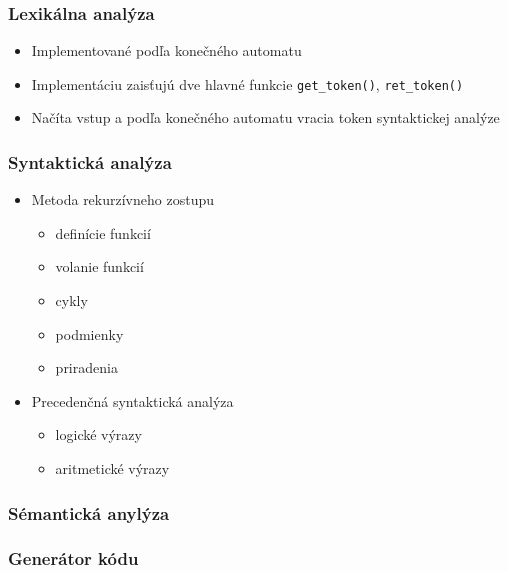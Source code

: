 \documentclass[usenames,dvipsnames]{beamer}
\begin{document}
\begin{frame}
	\frametitle{Lexikálna analýza}
	
	\begin{itemize}
	    
		\item{Implementované podľa konečného automatu}
		\item{Implementáciu zaisťujú dve hlavné funkcie \texttt{get\_token()}, \texttt{ret\_token()}}
		\item{Načíta vstup a podľa konečného automatu vracia token syntaktickej analýze}
	\end{itemize}

\end{frame}
%	
\begin{frame}
	\frametitle{Syntaktická analýza}
	\begin{itemize}
		\item{Metoda rekurzívneho zostupu}
			\begin{itemize}
				\item definície funkcií
			 	\item volanie funkcií
				\item cykly
				\item podmienky
				\item priradenia
			\end{itemize}
		\item{Precedenčná syntaktická analýza}
		\begin{itemize}
			\item logické výrazy
			\item aritmetické výrazy
		\end{itemize}
	\end{itemize}

\end{frame}
%
\begin{frame}
	\frametitle{Sémantická anylýza}

\end{frame}
%
\begin{frame}
	\frametitle{Generátor kódu}

\end{frame}
\end{document}
